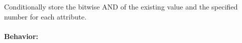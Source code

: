 Conditionally store the bitwise AND of the existing value and the specified
number for each attribute.

\paragraph{Behavior:}
\begin{itemize}[noitemsep]


\end{itemize}
